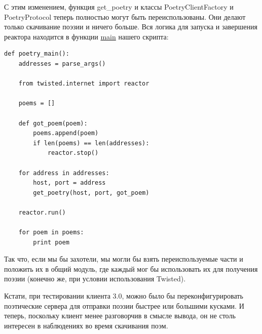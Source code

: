 
С этим изменением, функция get\_poetry и классы PoetryClientFactory и 
PoetryProtocol теперь полностью могут быть переиспользованы. 
Они делают только скачивание поэзии и ничего больше. Вся логика для 
запуска и завершения реактора находится в функции 
\href{http://github.com/jdavisp3/twisted-intro/blob/master/twisted-client-3/get-poetry.py#L90}{main}  
нашего скрипта: 

\begin{scriptsize}\begin{verbatim}
def poetry_main():
    addresses = parse_args()

    from twisted.internet import reactor

    poems = []

    def got_poem(poem):
        poems.append(poem)
        if len(poems) == len(addresses):
            reactor.stop()

    for address in addresses:
        host, port = address
        get_poetry(host, port, got_poem)

    reactor.run()

    for poem in poems:
        print poem
\end{verbatim}\end{scriptsize}


Так что, если мы бы захотели, мы могли бы взять переиспользуемые 
части и положить их в общий модуль, где каждый мог бы использовать 
их для получения поэзии (конечно же, при условии использования Twisted).


Кстати, при тестировании клиента 3.0, можно было бы 
переконфигурировать поэтические сервера для отправки 
поэзии быстрее или большими кусками. И теперь, поскольку клиент 
менее разговорчив в смысле вывода, он не столь интересен в 
наблюдениях во время скачивания поэм.


